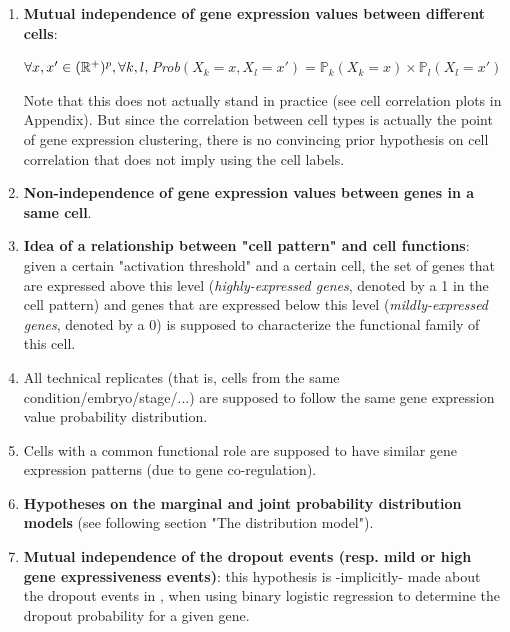 \documentclass{report}
\begin{document}
\begin{enumerate}
\item \textbf{Mutual independence of gene expression values between different cells}:\\

\begin{center}
$\forall x, x' \in (\mathbb{R}^{+})^{p}, \forall k, l,\\ $\textit{Prob}$(X_k = x, X_l = x') = \mathbb{P}_k(X_k = x) \times \mathbb{P}_l(X_l = x') $
\end{center}

Note that this does not actually stand in practice (see cell correlation plots in Appendix). But since the correlation between cell types is actually the point of gene expression clustering, there is no convincing prior hypothesis on cell correlation that does not imply using the cell labels.

\item \textbf{Non-independence of gene expression values between genes in a same cell}.\\

\item \textbf{Idea of a relationship between "cell pattern" and cell functions}: given a certain "activation threshold" and a certain cell, the set of genes that are expressed above this level (\textit{highly-expressed genes}, denoted by a 1 in the cell pattern) and genes that are expressed below this level (\textit{mildly-expressed genes}, denoted by a 0) is supposed to characterize the functional family of this cell.

\item All technical replicates (that is, cells from the same condition/embryo/stage/...) are supposed to follow the same gene expression value probability distribution.

\item Cells with a common functional role are supposed to have similar gene expression patterns (due to gene co-regulation\cite{barash2002context}).

\item \textbf{Hypotheses on the marginal and joint probability distribution models} (see following section "The distribution model").

\item \textbf{Mutual independence of the dropout events (resp. mild or high gene expressiveness events)}: this hypothesis is -implicitly- made about the dropout events in \cite{kharchenko2014bayesian}, when using binary logistic regression to determine the dropout probability for a given gene.
\end{enumerate}
\end{document}
